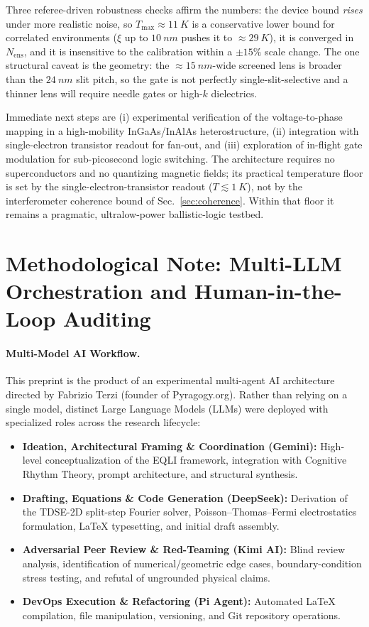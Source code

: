 \documentclass[11pt,a4paper]{article}
\begin{document}
Three referee-driven robustness checks affirm the numbers: the device bound
\emph{rises} under more realistic noise, so $T_{\max}\approx\SI{11}{K}$ is a
conservative lower bound for correlated environments ($\xi$ up to
$\SI{10}{nm}$ pushes it to $\approx\SI{29}{K}$), it is converged in
$N_{\text{ens}}$, and it is insensitive to the calibration within a
$\pm15\%$ scale change. The one structural caveat is the geometry: the
$\approx\SI{15}{nm}$-wide screened lens is broader than the
$\SI{24}{nm}$ slit pitch, so the gate is not perfectly single-slit-selective
and a thinner lens will require needle gates or high-$k$ dielectrics.

Immediate next steps are (i) experimental verification of the voltage-to-phase
mapping in a high-mobility InGaAs/InAlAs heterostructure, (ii) integration
with single-electron transistor readout for fan-out, and (iii) exploration
of in-flight gate modulation for sub-picosecond logic switching. The
architecture requires no superconductors and no quantizing magnetic fields;
its practical temperature floor is set by the single-electron-transistor
readout ($T\lesssim\SI{1}{K}$), not by the interferometer coherence bound of
Sec.~\ref{sec:coherence}. Within that floor it remains a pragmatic,
ultralow-power ballistic-logic testbed.

\section*{Methodological Note: Multi-LLM Orchestration and Human-in-the-Loop Auditing}

\paragraph{Multi-Model AI Workflow.}
This preprint is the product of an experimental multi-agent AI architecture directed by Fabrizio Terzi (founder of Pyragogy.org). Rather than relying on a single model, distinct Large Language Models (LLMs) were deployed with specialized roles across the research lifecycle:
\begin{itemize}
    \item \textbf{Ideation, Architectural Framing \& Coordination (Gemini):} High-level conceptualization of the EQLI framework, integration with Cognitive Rhythm Theory, prompt architecture, and structural synthesis.
    \item \textbf{Drafting, Equations \& Code Generation (DeepSeek):} Derivation of the TDSE-2D split-step Fourier solver, Poisson--Thomas--Fermi electrostatics formulation, LaTeX typesetting, and initial draft assembly.
    \item \textbf{Adversarial Peer Review \& Red-Teaming (Kimi AI):} Blind review analysis, identification of numerical/geometric edge cases, boundary-condition stress testing, and refutal of ungrounded physical claims.
    \item \textbf{DevOps Execution \& Refactoring (Pi Agent):} Automated LaTeX compilation, file manipulation, versioning, and Git repository operations.
\end{itemize}
\end{document}

